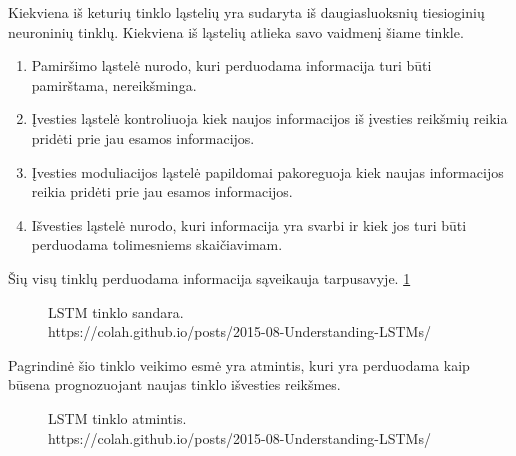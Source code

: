 Kiekviena iš keturių tinklo ląstelių yra sudaryta iš daugiasluoksnių tiesioginių neuroninių tinklų. Kiekviena iš ląstelių atlieka savo vaidmenį šiame tinkle.

\begin{enumerate}
  \item Pamiršimo ląstelė nurodo, kuri perduodama informacija turi būti pamirštama, nereikšminga.
  \item Įvesties ląstelė kontroliuoja kiek naujos informacijos iš įvesties reikšmių reikia pridėti prie jau esamos informacijos.
  \item Įvesties moduliacijos ląstelė papildomai pakoreguoja kiek naujas informacijos reikia pridėti prie jau esamos informacijos.
  \item Išvesties ląstelė nurodo, kuri informacija yra svarbi ir kiek jos turi būti perduodama tolimesniems skaičiavimam.
\end{enumerate}

Šių visų tinklų perduodama informacija sąveikauja tarpusavyje. \ref{fig:lstmveikimas}

\begin{figure}[h!]
  \centering
{}
\caption{LSTM tinklo sandara.\\https://colah.github.io/posts/2015-08-Understanding-LSTMs/}
\label{fig:lstmveikimas}
\end{figure}

Pagrindinė šio tinklo veikimo esmė yra atmintis, kuri yra perduodama kaip būsena prognozuojant naujas tinklo išvesties reikšmes.

\begin{figure}[h!]
  \centering
{}
\caption{LSTM tinklo atmintis.\\https://colah.github.io/posts/2015-08-Understanding-LSTMs/}
\label{fig:lstmcore}
\end{figure}

